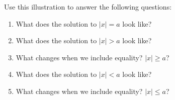 \documentclass{ximera}
\begin{document}
\begin{center}
\end{center}

Use this illustration to answer the following questions:

\begin{enumerate}
 \item What does the solution to $|x| = a$ look like?
 \item What does the solution to $|x| > a$ look like?
 \item What changes when we include equality? $|x| \geq a$?
 \item What does the solution to $|x| < a$ look like?
 \item What changes when we include equality? $|x| \leq a$?
\end{enumerate}

\begin{center}
\end{center}
\end{document}
